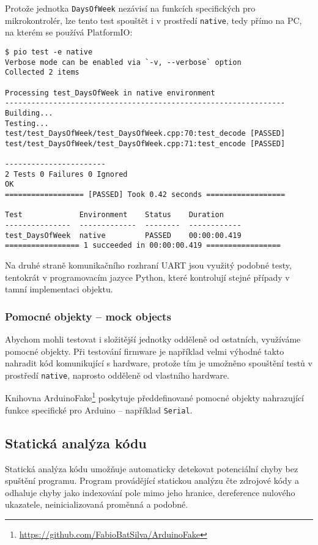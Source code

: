 Protože jednotka \texttt{DaysOfWeek} nezávisí na funkcích specifických pro
mikrokontrolér, lze tento test spouštět i v prostředí \texttt{native}, tedy
přímo na PC, na kterém se používá PlatformIO:
\begin{lstlisting}[style=terminal,columns=fixed]
$ pio test -e native
Verbose mode can be enabled via `-v, --verbose` option
Collected 2 items

Processing test_DaysOfWeek in native environment
----------------------------------------------------------------
Building...
Testing...
test/test_DaysOfWeek/test_DaysOfWeek.cpp:70:test_decode	[PASSED]
test/test_DaysOfWeek/test_DaysOfWeek.cpp:71:test_encode	[PASSED]

-----------------------
2 Tests 0 Failures 0 Ignored
OK
================== [PASSED] Took 0.42 seconds ==================

Test             Environment    Status    Duration
---------------  -------------  --------  ------------
test_DaysOfWeek  native         PASSED    00:00:00.419
================= 1 succeeded in 00:00:00.419 =================
\end{lstlisting}

Na druhé straně komunikačního rozhraní UART jsou využitý podobné testy,
tentokrát v programovacím jazyce Python, které kontrolují stejné případy
v tamní implementaci objektu.


\subsubsection{Pomocné objekty -- mock objects}
Abychom mohli testovat i složitější jednotky odděleně od ostatních, využíváme
pomocné objekty. Při testování firmware je například velmi výhodné takto
nahradit kód komunikující s hardware, protože tím je umožněno spouštění testů
v prostředí \texttt{native}, naprosto odděleně od vlastního hardware.

Knihovna
ArduinoFake\footnote{\url{https://github.com/FabioBatSilva/ArduinoFake}}
poskytuje předdefinované pomocné objekty nahrazující funkce specifické pro
Arduino -- například \texttt{Serial}.


\subsection{Statická analýza kódu}
Statická analýza kódu umožňuje automaticky detekovat potenciální chyby bez
spuštění programu. Program provádějící statickou analýzu čte zdrojové kódy
a odhaluje chyby jako indexování pole mimo jeho hranice, dereference nulového
ukazatele, neinicializovaná proměnná a podobné.

